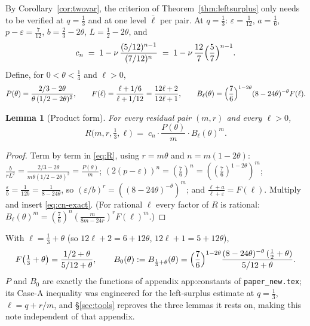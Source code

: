 \documentclass[11pt]{amsart}
\newtheorem{lemma}[theorem]{Lemma}
\theoremstyle{remark}
\newcommand{\lbar}{\bar\ell}
\begin{document}
By Corollary~\ref{cor:twovar}, the criterion of Theorem~\ref{thm:leftsurplus} only needs to be verified at $q=\tfrac13$ and at one level $\lbar$ per pair.  At $q=\tfrac13$: $\varepsilon=\tfrac1{12}$, $a=\tfrac16$, $p-\varepsilon=\tfrac7{12}$, $b=\tfrac23-2\theta$, $L=\tfrac12-2\theta$, and
\begin{equation}\label{eq:cn-exact}
        c_n\;=\;1-\nu\,\frac{(5/12)^{n-1}}{(7/12)^{n}}
        \;=\;1-\nu\,\frac{12}{7}\Bigl(\frac57\Bigr)^{n-1}.
\end{equation}
Define, for $0<\theta<\tfrac14$ and $\ell>0$,
\begin{equation}\label{eq:PBF}
        P(\theta)=\frac{2/3-2\theta}{\theta\,(1/2-2\theta)^2},
        \qquad
        F(\ell)=\frac{\ell+1/6}{\ell+1/12}=\frac{12\ell+2}{12\ell+1},
        \qquad
        B_\ell(\theta)=\Bigl(\frac76\Bigr)^{1-2\theta}(8-24\theta)^{-\theta}F(\ell).
\end{equation}

\begin{lemma}[Product form]\label{lem:prod}
For every residual pair $(m,r)$ and every $\ell>0$,
\[
        R\bigl(m,r,\tfrac13,\ell\bigr)
        \;=\;c_n\cdot\frac{P(\theta)}{m}\cdot B_\ell(\theta)^m .
\]
\end{lemma}

\begin{proof}
Term by term in \eqref{eq:R}, using $r=m\theta$ and $n=m(1-2\theta)$:
$\frac{b}{rL^2}=\frac{2/3-2\theta}{m\theta(1/2-2\theta)^2}=\frac{P(\theta)}m$;
$(2(p-\varepsilon))^n=(\tfrac76)^n=((\tfrac76)^{1-2\theta})^m$;
$\frac{\varepsilon}{b}=\frac1{12b}=\frac1{8-24\theta}$, so $(\varepsilon/b)^r=((8-24\theta)^{-\theta})^m$; and
$\frac{\ell+a}{\ell+\varepsilon}=F(\ell)$.  Multiply and insert \eqref{eq:cn-exact}.  (For rational $\ell$ every factor of $R$ is rational: $B_\ell(\theta)^m=(\tfrac76)^n(\tfrac{m}{8m-24r})^rF(\ell)^m$.)
\end{proof}

With $\ell=\tfrac13+\theta$ (so $12\ell+2=6+12\theta$, $12\ell+1=5+12\theta$),
\begin{equation}\label{eq:B0}
        F\bigl(\tfrac13+\theta\bigr)=\frac{1/2+\theta}{5/12+\theta},
        \qquad
        B_0(\theta):=B_{\frac13+\theta}(\theta)
        =\Bigl(\frac76\Bigr)^{1-2\theta}\frac{(8-24\theta)^{-\theta}\,(\tfrac12+\theta)}{5/12+\theta}.
\end{equation}
$P$ and $B_0$ are exactly the functions of appendix app:constants of \texttt{paper\_new.tex}; its Case-A inequality was engineered for the left-surplus estimate at $q=\tfrac13$, $\ell=q+r/m$, and \S\ref{sec:tools} reproves the three lemmas it rests on, making this note independent of that appendix.
\end{document}
